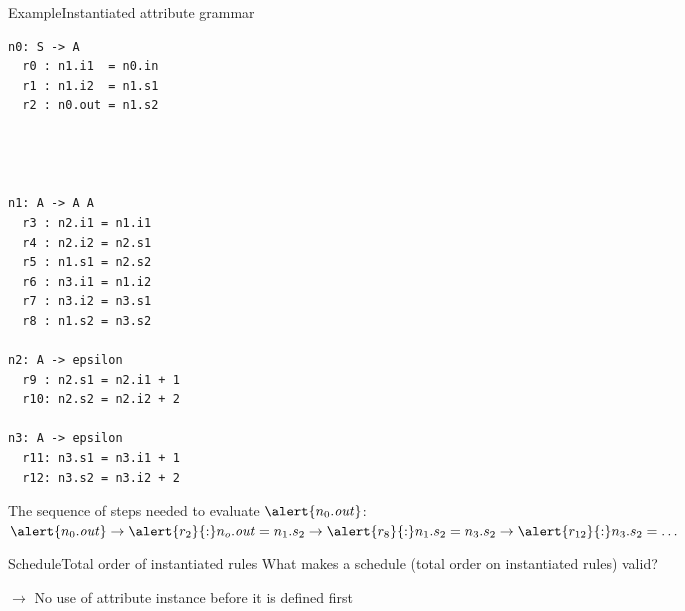 
\begin{frame}[fragile=singleslide]{Example}{Instantiated attribute grammar}


\begin{multicols}{3}
\begin{Verbatim}[fontsize=\scriptsize]
n0: S -> A
  r0 : n1.i1  = n0.in
  r1 : n1.i2  = n1.s1
  r2 : n0.out = n1.s2




n1: A -> A A
  r3 : n2.i1 = n1.i1
  r4 : n2.i2 = n2.s1
  r5 : n1.s1 = n2.s2
  r6 : n3.i1 = n1.i2
  r7 : n3.i2 = n3.s1
  r8 : n1.s2 = n3.s2

n2: A -> epsilon
  r9 : n2.s1 = n2.i1 + 1
  r10: n2.s2 = n2.i2 + 2
    
n3: A -> epsilon
  r11: n3.s1 = n3.i1 + 1
  r12: n3.s2 = n3.i2 + 2
\end{Verbatim}
\end{multicols}

The sequence of steps needed to evaluate $\alert{n_0.\mathit{out}}$:
$\alert{n_0.\mathit{out}} \to \alert{r_2}{:} n_o.\mathit{out} = n_1.s_2 \to \alert{r_8}{:} n_1.s_2 = n_3.s_2 \to \alert{r_{12}}{:}n_3.s_2 = \dots$

\end{frame}


\begin{frame}{Schedule}{Total order of instantiated rules}
What makes a schedule (total order on instantiated rules) valid?

\newlinevspace

$\to$ \alert{No use of attribute instance before it is defined first}

\end{frame}

